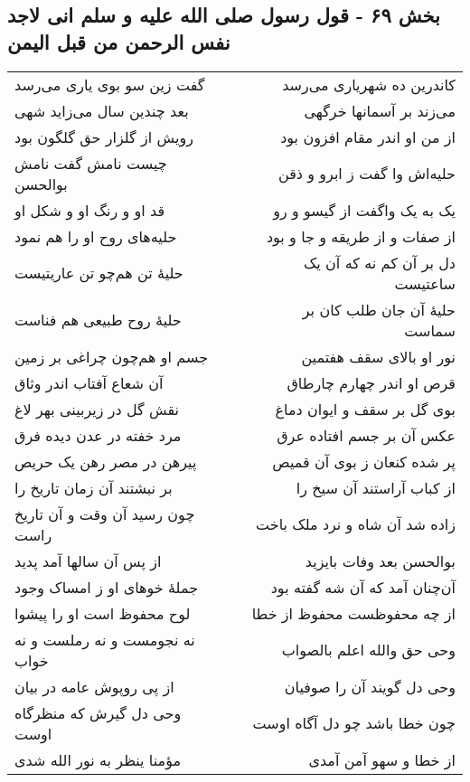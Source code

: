 \begin{center}
\section*{بخش ۶۹ - قول رسول صلی الله علیه و سلم انی لاجد نفس الرحمن من قبل الیمن}
\label{sec:sh069}
\begin{longtable}{l p{0.5cm} r}
گفت زین سو بوی یاری می‌رسد
&&
کاندرین ده شهریاری می‌رسد
\\
بعد چندین سال می‌زاید شهی
&&
می‌زند بر آسمانها خرگهی
\\
رویش از گلزار حق گلگون بود
&&
از من او اندر مقام افزون بود
\\
چیست نامش گفت نامش بوالحسن
&&
حلیه‌اش وا گفت ز ابرو و ذقن
\\
قد او و رنگ او و شکل او
&&
یک به یک واگفت از گیسو و رو
\\
حلیه‌های روح او را هم نمود
&&
از صفات و از طریقه و جا و بود
\\
حلیهٔ تن هم‌چو تن عاریتیست
&&
دل بر آن کم نه که آن یک ساعتیست
\\
حلیهٔ روح طبیعی هم فناست
&&
حلیهٔ آن جان طلب کان بر سماست
\\
جسم او هم‌چون چراغی بر زمین
&&
نور او بالای سقف هفتمین
\\
آن شعاع آفتاب اندر وثاق
&&
قرص او اندر چهارم چارطاق
\\
نقش گل در زیربینی بهر لاغ
&&
بوی گل بر سقف و ایوان دماغ
\\
مرد خفته در عدن دیده فرق
&&
عکس آن بر جسم افتاده عرق
\\
پیرهن در مصر رهن یک حریص
&&
پر شده کنعان ز بوی آن قمیص
\\
بر نبشتند آن زمان تاریخ را
&&
از کباب آراستند آن سیخ را
\\
چون رسید آن وقت و آن تاریخ راست
&&
زاده شد آن شاه و نرد ملک باخت
\\
از پس آن سالها آمد پدید
&&
بوالحسن بعد وفات بایزید
\\
جملهٔ خوهای او ز امساک وجود
&&
آن‌چنان آمد که آن شه گفته بود
\\
لوح محفوظ است او را پیشوا
&&
از چه محفوظست محفوظ از خطا
\\
نه نجومست و نه رملست و نه خواب
&&
وحی حق والله اعلم بالصواب
\\
از پی روپوش عامه در بیان
&&
وحی دل گویند آن را صوفیان
\\
وحی دل گیرش که منظرگاه اوست
&&
چون خطا باشد چو دل آگاه اوست
\\
مؤمنا ینظر به نور الله شدی
&&
از خطا و سهو آمن آمدی
\\
\end{longtable}
\end{center}
